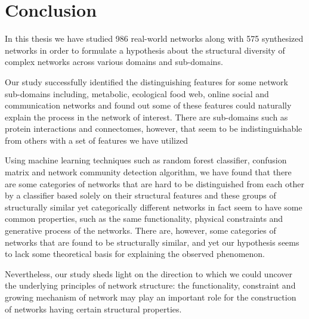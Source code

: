 \chapter{Conclusion}
 In this thesis we have studied 986 real-world networks along with 575 synthesized networks in order to formulate a hypothesis about the structural diversity of complex networks across various domains and sub-domains.
 
  Our study successfully identified the distinguishing features for some network sub-domains including, metabolic, ecological food web, online social and communication networks and found out some of these features could naturally explain the process in the network of interest. There are sub-domains such as protein interactions and connectomes, however, that seem to be indistinguishable from others with a set of features we have utilized 
  
  Using machine learning techniques such as random forest classifier, confusion matrix and network community detection algorithm, we have found that there are some categories of networks that are hard to be distinguished from each other by a classifier based solely on their structural features and these groups of structurally similar yet categorically different networks in fact seem to have some common properties, such as the same functionality, physical constraints and generative process of the networks. There are, however, some categories of networks that are found to be structurally similar, and yet our hypothesis seems to lack some theoretical basis for explaining the observed phenomenon.
 
 Nevertheless, our study sheds light on the direction to which we could uncover the underlying principles of network structure: the functionality, constraint and growing mechanism of network may play an important role for the construction of networks having certain structural properties.
 